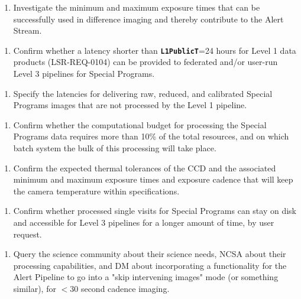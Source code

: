 \documentclass[DM,lsstdraft,toc]{lsstdoc}
\begin{document}
\begin{enumerate}[topsep=-10pt,label= \textbf{Concern \Roman*.}] \item \label{C1} Investigate the minimum and maximum exposure times that can be successfully used in difference imaging and thereby contribute to the Alert Stream. \end{enumerate}
\begin{enumerate}[resume,topsep=-10pt,label= \textbf{Concern \Roman*.}] \item \label{C2} Confirm whether a latency shorter than {\tt \textbf{L1PublicT}}=24 hours for Level 1 data products (LSR-REQ-0104) can be provided to federated and/or user-run Level 3 pipelines for Special Programs. \end{enumerate}
\begin{enumerate}[resume,topsep=-10pt,label= \textbf{Concern \Roman*.}] \item \label{C3} Specify the latencies for delivering raw, reduced, and calibrated Special Programs images that are not processed by the Level 1 pipeline. \end{enumerate}
\begin{enumerate}[resume,topsep=-10pt,label= \textbf{Concern \Roman*.}] \item \label{C4} Confirm whether the computational budget for processing the Special Programs data requires more than 10\% of the total resources, and on which batch system the bulk of this processing will take place. \end{enumerate}
\begin{enumerate}[resume,topsep=-10pt,label= \textbf{Concern \Roman*.}] \item \label{C5} Confirm the expected thermal tolerances of the CCD and the associated minimum and maximum exposure times and exposure cadence that will keep the camera temperature within specifications. \end{enumerate}
\begin{enumerate}[topsep=-10pt,label= \textbf{Concern \Roman*.},resume] \item \label{C6} Confirm whether processed single visits for Special Programs can stay on disk and accessible for Level 3 pipelines for a longer amount of time, by user request. \end{enumerate}
\begin{enumerate}[resume,topsep=-10pt,label= \textbf{Concern \Roman*.}] \item \label{C7} Query the science community about their science needs, NCSA about their processing capabilities, and DM about incorporating a functionality for the Alert Pipeline to go into a "skip intervening images" mode (or something similar), for $<30$ second cadence imaging. \end{enumerate}
\end{document}
